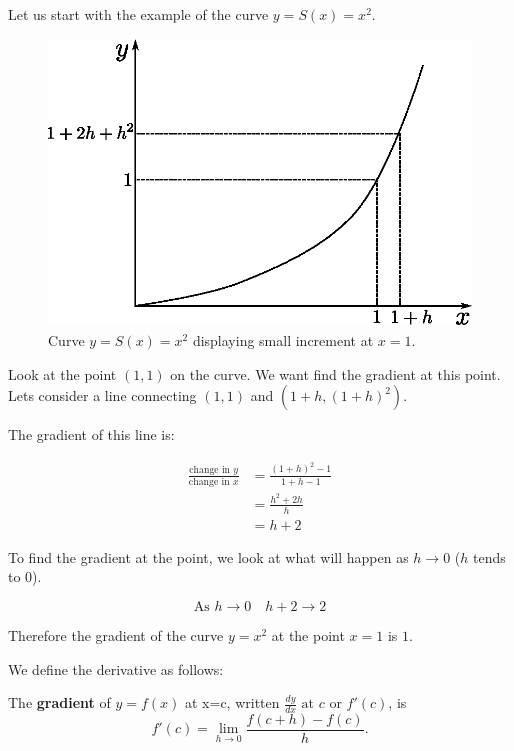 \begin{example} 
Let us start with the example of the curve $y=S(x)=x^2$.

\begin{figure}[H]
\centering
\includegraphics[scale=0.8]{img/increment-quadratic}
\caption{Curve $y=S(x)=x^2$ displaying small increment at $x=1$.}
\label{fig:increment-quadratic}
\end{figure}


Look at the point $(1,1)$ on the curve. We want find the gradient at this point. Lets consider a line connecting $(1,1)$ and $(1+h,(1+h)^2)$.

The gradient of this line is:

\begin{align}
\frac{\text{change in }y}{\text{change in }x} &= \frac{(1+h)^2-1}{1+h-1}\\
&=\frac{h^2+2h}{h}\\
&=h+2
\end{align}

To find the gradient at the point, we look at what will happen as $h\rightarrow0$ ($h$ tends to 0).

$$\text{As }h\rightarrow0\quad h+2\rightarrow2$$

Therefore the gradient of the curve $y=x^2$ at the point $x=1$ is $1$.

\end{example}

We define the derivative as follows:
\begin{definition}
The \textbf{gradient} of $y=f(x)$ at x=c, written $\frac{dy}{dx}\text{ at }c$ or $f'(c)$, is
$$f'(c)=\lim_{h\rightarrow 0}\frac{f(c+h)-f(c)}{h}.$$
\end{definition}

